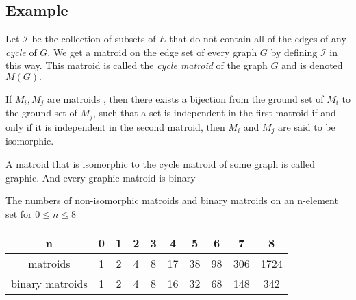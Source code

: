 \documentclass[../main.tex]{subfiles}
\begin{document}
\subsection{Example}
\begin{defn}
Let $\mathcal{I}$ be the collection of subsets of $E$ that do not contain all of the edges of any \textit{cycle} of $G.$
We get a matroid on the edge set of every graph $G$ by defining $\mathcal{I}$ in this way. This matroid is called the \textit{cycle matroid} of the graph $G$ and is denoted $M(G).$
\end{defn}

\begin{defn}
If $M_i, M_j$ are matroids , then there exists a bijection from the ground set of $M_i$ to the ground set of $M_j$, such that a set is independent in the first matroid if and only if it is independent in the second matroid, then $M_i$ and $M_j$ are said to be isomorphic. 
\end{defn}

\begin{note}
A matroid that is isomorphic to the cycle matroid of some graph is called graphic.
And every graphic matroid is binary
\end{note}

\noindent The numbers of non-isomorphic matroids and binary matroids on an n-element set for $0 \leq n \leq  8$
\begin{center}
 \begin{tabular}{| c c c c c c c c c c |} 
 \hline
 n & 0 & 1 & 2 & 3 & 4 & 5 & 6 & 7 & 8 \\ [0.5ex] 
 \hline\hline
 matroids & 1 & 2 & 4 & 8 & 17 & 38 & 98 & 306 & 1724\\ 
 \hline
 binary matroids & 1 & 2 & 4 & 8 & 16 & 32 & 68 & 148 & 342\\
 \hline
\end{tabular}
\end{center}
\end{document}
